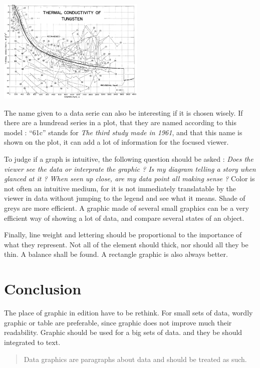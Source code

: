 \centerline{
\includegraphics[width=07cm]{./illustrations/annexes/relationel_tungsten.eps}
}
The name given to a data serie can also be interesting if it is chosen wisely.
 If there are a hundread series in a plot, that they are named according to this model : ``61c'' stands for \emph{The third study made in 1961}, and that this name is shown on the plot, it can add a lot of information for the focused viewer.

To judge if a graph is intuitive, the following question should be asked : \emph{Does the viewer see the data or interprate the graphic ? Is my diagram telling a story when glanced at it ? When seen up close, are my data point all making sense ?}
 Color is not often an intuitive medium, for it is not immediately translatable by the viewer in data without jumping to the legend and see what it means. Shade of greys are more efficient. A graphic made of several small graphics can be a very efficient way of showing a lot of data, and compare several states of an object.

Finally, line weight and lettering should be proportional to the importance of what they represent. Not all of the element should thick, nor should all they be thin. A balance shall be found. A rectangle graphic is also always better.
\section{Conclusion}

The place of graphic in edition have to be rethink. For small sets of data, wordly graphic or table are preferable, since graphic does not improve much their readability. Graphic should be used for a big sets of data. and they be should integrated to text. 
\begin{quote}
Data graphics are paragraphs about data and should be treated as such.
\end{quote}
